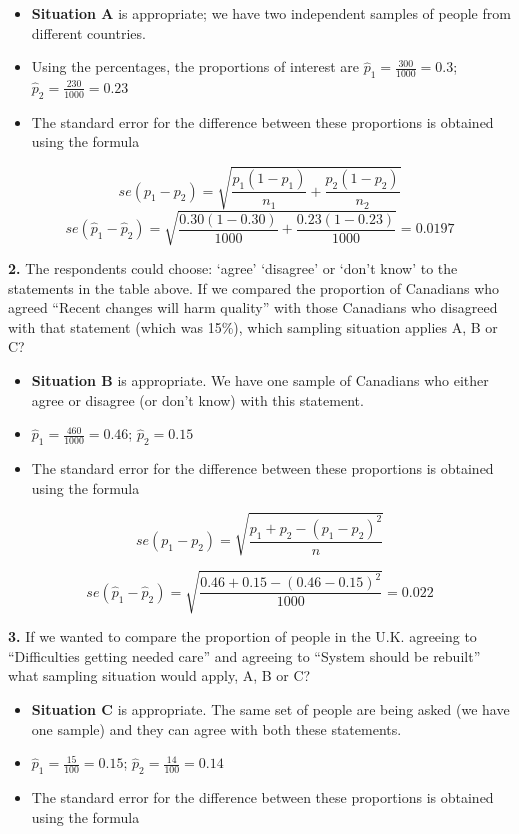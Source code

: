 \documentclass[
  oneside]{krantz}
\begin{document}
\begin{itemize}
\item
  \textbf{Situation A} is appropriate; we have two independent samples of people from different countries.
\item
  Using the percentages, the proportions of interest are \(\hat p_1 = \frac{300}{1000} = 0.3\); \(\hat p_2 = \frac{230}{1000} = 0.23\)
\item
  The standard error for the difference between these proportions is obtained using the formula
\end{itemize}

\[se(p_1-p_2) = \sqrt{\frac{p_1(1-p_1)}{n_1}+\frac{p_2(1-p_2)}{n_2}}\]
\[se(\hat p_1-\hat p_2) = \sqrt{\frac{0.30(1-0.30)}{1000}+\frac{0.23(1-0.23)}{1000}}=0.0197\]

\textbf{2.} The respondents could choose: `agree' `disagree' or `don't know' to the statements in the table above. If we compared the proportion of Canadians who agreed ``Recent changes will harm quality'' with those Canadians who disagreed with that statement (which was 15\%), which sampling situation applies A, B or C?

\begin{itemize}
\item
  \textbf{Situation B} is appropriate. We have one sample of Canadians who either agree or disagree (or don't know) with this statement.
\item
  \(\hat p_1 = \frac{460}{1000} = 0.46\); \(\hat p_2 = 0.15\)
\item
  The standard error for the difference between these proportions is obtained using the formula
\end{itemize}

\[se(p_1-p_2) =\sqrt{\frac{p_1+ p_2-(p_1-p_2)^2}{n}}\]

\[se(\hat p_1-\hat p_2) =\sqrt{\frac{0.46+ 0.15-(0.46-0.15)^2}{1000}}=0.022\]

\textbf{3.} If we wanted to compare the proportion of people in the U.K. agreeing to ``Difficulties getting needed care'' and agreeing to ``System should be rebuilt'' what sampling situation would apply, A, B or C?

\begin{itemize}
\item
  \textbf{Situation C} is appropriate. The same set of people are being asked (we have one sample) and they can agree with both these statements.
\item
  \(\hat p_1 = \frac{15}{100} = 0.15\); \(\hat p_2 = \frac{14}{100} = 0.14\)
\item
  The standard error for the difference between these proportions is obtained using the formula
\end{itemize}
\end{document}
